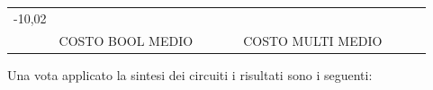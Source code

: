 \documentclass[italian,]{book}
\begin{document}
\begin{longtable}[]{@{}lllllllll@{}}
\begin{minipage}[t]{0.07\columnwidth}
-10,02\strut
\end{minipage}\tabularnewline
\begin{minipage}[t]{0.07\columnwidth}\raggedright
\strut
\end{minipage} & \begin{minipage}[t]{0.11\columnwidth}\raggedright
COSTO BOOL MEDIO\strut
\end{minipage} & \begin{minipage}[t]{0.08\columnwidth}\raggedright
\strut
\end{minipage} & \begin{minipage}[t]{0.07\columnwidth}\raggedright
\strut
\end{minipage} & \begin{minipage}[t]{0.09\columnwidth}\raggedright
\strut
\end{minipage} & \begin{minipage}[t]{0.12\columnwidth}\raggedright
COSTO MULTI MEDIO\strut
\end{minipage} & \begin{minipage}[t]{0.08\columnwidth}\raggedright
\strut
\end{minipage} & \begin{minipage}[t]{0.07\columnwidth}\raggedright
\strut
\end{minipage} & \begin{minipage}[t]{0.07\columnwidth}\raggedright
\strut
\end{minipage}\tabularnewline
\bottomrule
\end{longtable}

\newpage

Una vota applicato la sintesi dei circuiti i risultati sono i seguenti:
\end{document}
